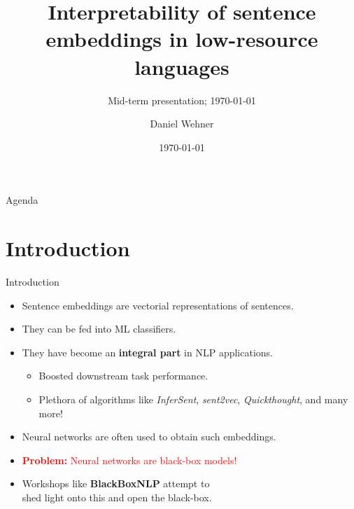 \documentclass[accentcolor=tud1a,colorbacktitle,inverttitle,landscape,german,presentation,t]{tudbeamer}
\begin{document}
\title[]{Interpretability of sentence embeddings in low-resource languages}
\subtitle{Mid-term presentation; \today}

\author{Daniel Wehner}
\date{\today}

\begin{titleframe}
\end{titleframe}


\begin{frame}{Agenda}{}
	\tableofcontents
\end{frame}


\section{Introduction}


\begin{frame}{Introduction}{}
	\vspace*{-4mm}
	\begin{itemize}\setlength\itemsep{1em}
		\item Sentence embeddings are vectorial representations of sentences.
		\item They can be fed into ML classifiers.
		\item They have become an \textbf{integral part} in NLP applications.
		\begin{itemize}
			\item Boosted downstream task performance.
			\item Plethora of algorithms like \textit{InferSent}, \textit{sent2vec}, \textit{Quickthought}, and many more!
		\end{itemize}
		\item Neural networks are often used to obtain such embeddings.
		\item \textcolor{red}{\textbf{Problem:} Neural networks are black-box models!}
		\item Workshops like \textbf{BlackBoxNLP} attempt to \\
			shed light onto this and open the black-box.
	\end{itemize}

\end{frame}
\end{document}
